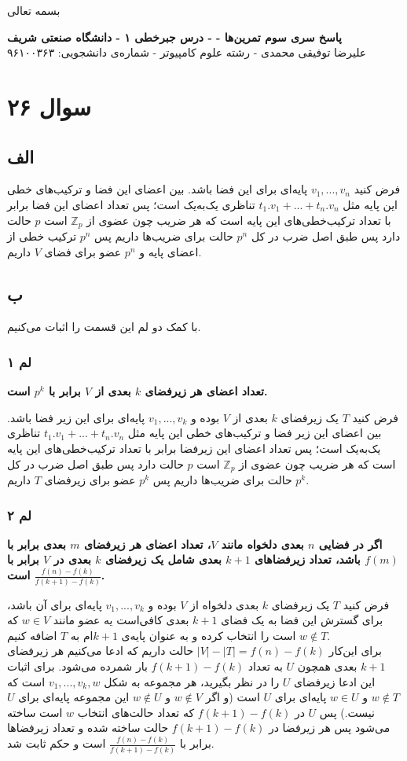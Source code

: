 \documentclass[12pt,a4paper]{article}
\begin{document}
\begin{center}
	بسمه تعالی
\end{center}
\begin{center}
	\textbf{
		پاسخ سری سوم تمرین‌ها
		-
		- درس جبرخطی ۱ - دانشگاه صنعتی شریف}
	\\
	علیرضا توفیقی محمدی - رشته علوم کامپیوتر - شماره‌ی دانشجویی: ۹۶۱۰۰۳۶۳
\end{center}
\section{سوال ۲۶}
\subsection{الف}
فرض کنید 
$v_1, ..., v_n$
پایه‌ای برای این فضا باشد. بین اعضای این فضا و ترکیب‌های خطی این پایه مثل
$t_1.v_1 + ... + t_n.v_n$
تناظری یک‌به‌یک است؛ پس تعداد اعضای این فضا برابر با تعداد ترکیب‌خطی‌های این پایه است که هر ضریب چون عضوی از 
$\mathbb{Z}_p$
است $p$ حالت دارد پس طبق اصل ضرب در کل $p^n$ حالت برای ضریب‌ها داریم پس $p^n$ ترکیب خطی از اعضای پایه و $p^n$ عضو برای فضای $V$ داریم.
\subsection{ب}
با کمک دو لم این قسمت را اثبات می‌کنیم.
\subsubsection{لم ۱}
\textbf{
	تعداد اعضای هر زیرفضای $k$ بعدی از $V$ برابر با $p^k$ است.
}


فرض کنید $T$ یک زیرفضای $k$ بعدی از $V$ بوده و 
$v_1, ..., v_k$
پایه‌ای برای این زیر فضا باشد. بین اعضای این زیر فضا و ترکیب‌های خطی این پایه مثل
$t_1.v_1 + ... + t_n.v_n$
تناظری یک‌به‌یک است؛ پس تعداد اعضای این زیرفضا برابر با تعداد ترکیب‌خطی‌های این پایه است که هر ضریب چون عضوی از 
$\mathbb{Z}_p$
است $p$ حالت دارد پس طبق اصل ضرب در کل $p^k$ حالت برای ضریب‌ها داریم پس $p^k$ عضو برای زیرفضای $T$ داریم.
\subsubsection{لم ۲}
\textbf{
	اگر در فضایی $n$ بعدی دلخواه مانند $V$، تعداد اعضای هر زیرفضای $m$ بعدی برابر با $f(m)$ باشد، تعداد زیرفضا‌های $k+1$ بعدی شامل یک زیرفضای $k$ بعدی در $V$ برابر با 
	$\frac{f(n)-f(k)}{f(k+1)-f(k)}$
	است.
}

فرض کنید $T$ یک زیرفضای $k$ بعدی دلخواه از $V$ بوده و 
$v_1, ..., v_k$
پایه‌ای برای آن باشد، برای گسترش این فضا به یک فضای 
$k+1$
بعدی کافی‌است یه عضو مانند 
$w \in V$
 که 
 $w \notin T$
 است را انتخاب کرده و به عنوان پایه‌ی $k+1$ام به $T$ اضافه کنیم.
 \\
 برای این‌کار 
$|V| - |T| = f(n)-f(k)$
حالت داریم که ادعا می‌کنیم هر زیرفضای 
$k+1$
بعدی همچون $U$ به تعداد 
$f(k+1)-f(k)$
بار شمرده می‌شود.
برای اثبات این ادعا زیرفضای $U$ را در نظر بگیرید، هر مجموعه به شکل
$v_1, ... , v_k, w$
است که 
$w \notin T$
 و 
 $w \in U$
 پایه‌ای برای $U$ است (و اگر 
$w \notin V$
و
$w \notin U$
این مجموعه پایه‌ای برای $U$ نیست.)
پس $U$ در 
$f(k+1)-f(k)$
که تعداد حالت‌های انتخاب $w$ است ساخته می‌شود پس هر زیرفضا در 
$f(k+1)-f(k)$
حالت ساخته شده و تعداد زیرفضاها برابر با 
$\frac{f(n)-f(k)}{f(k+1)-f(k)}$
است و حکم ثابت شد.
\end{document}

